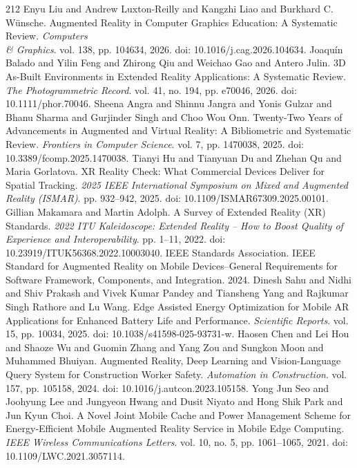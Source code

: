 \begin{thebibliography}{212}
 Enyu Liu and Andrew Luxton-Reilly and Kangzhi Liao and Burkhard C. W{\"u}nsche. Augmented Reality in Computer Graphics Education: A Systematic Review. \emph{Computers \\& Graphics}. vol. 138, pp. 104634, 2026. doi: 10.1016/j.cag.2026.104634.
 Joaqu{\'i}n Balado and Yilin Feng and Zhirong Qiu and Weichao Gao and Antero Julin. 3D As-Built Environments in Extended Reality Applications: A Systematic Review. \emph{The Photogrammetric Record}. vol. 41, no. 194, pp. e70046, 2026. doi: 10.1111/phor.70046.
 Sheena Angra and Shinnu Jangra and Yonis Gulzar and Bhanu Sharma and Gurjinder Singh and Choo Wou Onn. Twenty-Two Years of Advancements in Augmented and Virtual Reality: A Bibliometric and Systematic Review. \emph{Frontiers in Computer Science}. vol. 7, pp. 1470038, 2025. doi: 10.3389/fcomp.2025.1470038.
 Tianyi Hu and Tianyuan Du and Zhehan Qu and Maria Gorlatova. {XR} Reality Check: What Commercial Devices Deliver for Spatial Tracking. \emph{2025 IEEE International Symposium on Mixed and Augmented Reality (ISMAR)}. pp. 932--942, 2025. doi: 10.1109/ISMAR67309.2025.00101.
 Gillian Makamara and Martin Adolph. A Survey of Extended Reality ({XR}) Standards. \emph{2022 ITU Kaleidoscope: Extended Reality -- How to Boost Quality of Experience and Interoperability}. pp. 1--11, 2022. doi: 10.23919/ITUK56368.2022.10003040.
 {IEEE Standards Association}. {IEEE Standard for Augmented Reality on Mobile Devices--General Requirements for Software Framework, Components, and Integration}. 2024.
 Dinesh Sahu and Nidhi and Shiv Prakash and Vivek Kumar Pandey and Tiansheng Yang and Rajkumar Singh Rathore and Lu Wang. Edge Assisted Energy Optimization for Mobile {AR} Applications for Enhanced Battery Life and Performance. \emph{Scientific Reports}. vol. 15, pp. 10034, 2025. doi: 10.1038/s41598-025-93731-w.
 Haosen Chen and Lei Hou and Shaoze Wu and Guomin Zhang and Yang Zou and Sungkon Moon and Muhammed Bhuiyan. Augmented Reality, Deep Learning and Vision-Language Query System for Construction Worker Safety. \emph{Automation in Construction}. vol. 157, pp. 105158, 2024. doi: 10.1016/j.autcon.2023.105158.
 Yong Jun Seo and Joohyung Lee and Jungyeon Hwang and Dusit Niyato and Hong Shik Park and Jun Kyun Choi. A Novel Joint Mobile Cache and Power Management Scheme for Energy-Efficient Mobile Augmented Reality Service in Mobile Edge Computing. \emph{IEEE Wireless Communications Letters}. vol. 10, no. 5, pp. 1061--1065, 2021. doi: 10.1109/LWC.2021.3057114.

\end{thebibliography}

